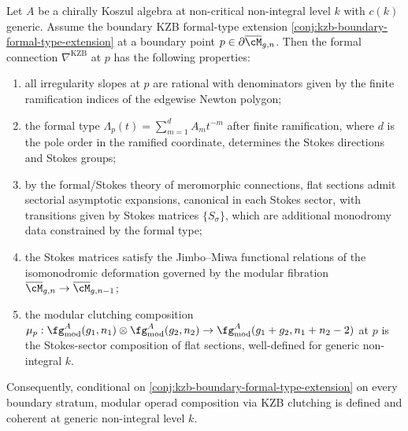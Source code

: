 \begin{theorem}
\label{thm:irregular-singular-kzb-regularity}
\ClaimStatusConditional
Let \(A\) be a chirally Koszul algebra at non-critical
non-integral level \(k\) with \(c(k)\) generic. Assume the
boundary KZB formal-type extension
\autoref{conj:kzb-boundary-formal-type-extension} at a boundary
point \(p \in \partial\overline{\cM}_{g,n}\). Then the formal
connection \(\nabla^{\mathrm{KZB}}\) at \(p\) has the following
properties:
\begin{enumerate}
 \item all irregularity slopes at \(p\) are rational with
 denominators given by the finite ramification indices of the
 edgewise Newton polygon;
 \item the formal type \(\Lambda_{p}(t)=\sum_{m=1}^{d}A_{m}t^{-m}\)
 after finite ramification, where \(d\) is the pole order in the
 ramified coordinate, determines the Stokes directions and Stokes
 groups;
 \item by the formal/Stokes theory of meromorphic connections,
 flat sections admit sectorial asymptotic expansions, canonical
 in each Stokes sector, with transitions given by Stokes matrices
 \(\{S_{\sigma}\}\), which are additional monodromy data
 constrained by the formal type;
 \item the Stokes matrices satisfy the Jimbo--Miwa functional
 relations of the isomonodromic deformation governed by the
 modular fibration
 \(\overline{\cM}_{g,n} \to \overline{\cM}_{g,n-1}\);
 \item the modular clutching composition
 \(\mu_{p}: \fg^{A}_{\mathrm{mod}}(g_{1}, n_{1})
 \otimes \fg^{A}_{\mathrm{mod}}(g_{2}, n_{2})
 \to \fg^{A}_{\mathrm{mod}}(g_{1}+g_{2}, n_{1}+n_{2}-2)\)
 at \(p\) is the Stokes-sector composition of flat sections,
 well-defined for generic non-integral \(k\).
\end{enumerate}
Consequently, conditional on
\autoref{conj:kzb-boundary-formal-type-extension} on every
boundary stratum, modular operad composition via KZB clutching is
defined and coherent at generic non-integral level \(k\).
\end{theorem}

